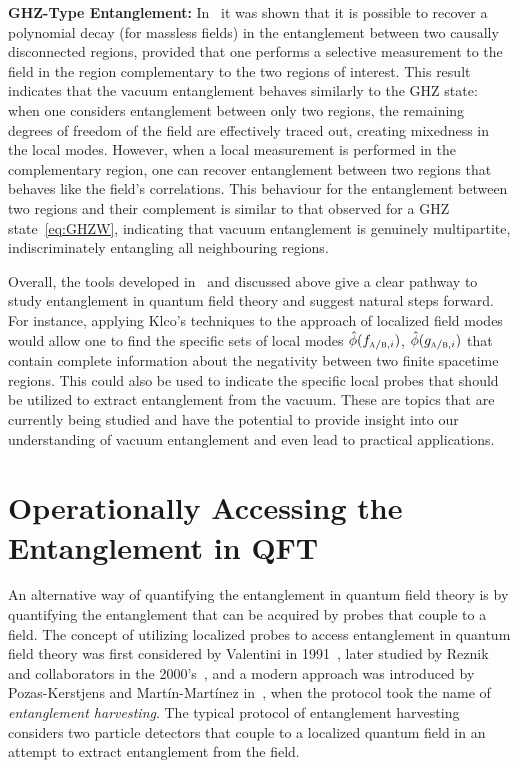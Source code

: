 \documentclass[letterpaper,12pt,titlepage,oneside,final]{book}
\newcommand{\tc}[1]{\textsc{#1}}
\begin{document}
\noindent\textbf{GHZ-Type Entanglement:} In~\cite{KlcoEntStrQFTII} it was shown that it is possible to recover a polynomial decay (for massless fields) in the entanglement between two causally disconnected regions, provided that one performs a selective measurement to the field in the region complementary to the two regions of interest. This result indicates that the vacuum entanglement behaves similarly to the GHZ state: when one considers entanglement between only two regions, the remaining degrees of freedom of the field are effectively traced out, creating mixedness in the local modes. However, when a local measurement is performed in the complementary region, one can recover entanglement between two regions that behaves like the field's correlations. This behaviour for the entanglement between two regions and their complement is similar to that observed for a GHZ state~\eqref{eq:GHZW}, indicating that vacuum entanglement is genuinely multipartite, indiscriminately entangling all neighbouring regions. %

Overall, the tools developed in~\cite{KlcoEntStrQFTI} and discussed above give a clear pathway to study entanglement in quantum field theory and suggest natural steps forward. For instance, applying Klco's techniques to the approach of localized field modes would allow one to find the specific sets of local modes $\hat{\phi}(f_{\tc{a}/\tc{b},i})$, $\hat{\phi}(g_{\tc{a}/\tc{b},i})$ that contain complete information about the negativity between two finite spacetime regions. This could also be used to indicate the specific local probes that should be utilized to extract entanglement from the vacuum. These are topics that are currently being studied and have the potential to provide insight into our understanding of vacuum entanglement and even lead to practical applications. 


\section{Operationally Accessing the Entanglement in QFT}\label{sec:OperationallyAccessingEnt}


An alternative way of quantifying the entanglement in quantum field theory is by quantifying the entanglement that can be acquired by probes that couple to a field. The concept of utilizing localized probes to access entanglement in quantum field theory was first considered by Valentini in 1991~\cite{Valentini1991}, later studied by Reznik and collaborators in the 2000's~\cite{Reznik2003}, and a modern approach was introduced by Pozas-Kerstjens and Mart\'in-Mart\'inez in~\cite{Pozas-Kerstjens:2015}, when the protocol took the name of \textit{entanglement harvesting}. The typical protocol of entanglement harvesting considers two particle detectors that couple to a localized quantum field in an attempt to extract entanglement from the field. 
\end{document}
